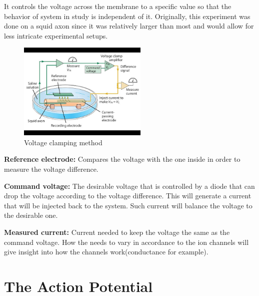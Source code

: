 \documentclass[class={myRUCProject}, crop=false]{standalone}
\begin{document}
It controls the voltage across the membrane to a specific value so that the behavior of system in study is independent of it. Originally, this experiment was done on a squid axon since it was relatively larger than most and would allow for less intricate experimental setups.

\begin{figure}[H]
    \centering
    \includegraphics[trim=0 25 0 25,clip,width=0.55\textwidth]{Pictures/Ana/clamp.png}
    \caption{Voltage clamping method}
\end{figure} 

\textbf{ Reference electrode:} Compares the voltage with the one inside in order to measure the voltage difference.

\textbf{ Command voltage:} The desirable voltage that is controlled by a diode that can drop the voltage according to the voltage difference. This will generate a current that will be injected back to the system. Such current will balance the voltage to the desirable one.

\textbf{ Measured current:} Current needed to keep the voltage the same as the command voltage. How the needs to vary in accordance to the ion channels will give insight into how the channels work(conductance for example).

\section{The Action Potential}\label{sec:ap}
\end{document}
